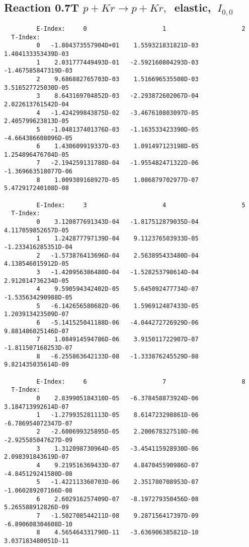 \documentclass[12pt]{article}
\begin{document}
\subsection{
Reaction 0.7T  $p + Kr \rightarrow p + Kr ,\ $
 elastic, $\  I_{0,0}$
}

\begin{small}\begin{verbatim}
         E-Index:     0                     1                     2
  T-Index:
         0   -1.804373557904D+01    1.559321831821D-03    1.404133353439D-03
         1    2.031777449493D-01   -2.592160804293D-03   -1.467585847319D-03
         2    9.686882765703D-03    1.516696535508D-03    3.516527725030D-05
         3    8.643169704852D-03   -2.293872602067D-04    2.022613761542D-04
         4   -1.424299843875D-02   -3.467610803097D-05    2.405799623813D-05
         5   -1.048137401376D-03   -1.163533423390D-05   -4.664386608096D-05
         6    1.430609919337D-03    1.091497123198D-05    1.254896476704D-05
         7   -2.194259131788D-04   -1.955482471322D-06   -1.369663518077D-06
         8    1.009389168927D-05    1.086879702977D-07    5.472917240108D-08
 
         E-Index:     3                     4                     5
  T-Index:
         0    3.120877691343D-04   -1.817512879035D-04    4.117059852657D-05
         1    1.242877797139D-04    9.112376503933D-05   -1.233416285351D-04
         2   -1.573876413696D-04    2.563895433480D-04    4.138546015912D-05
         3   -1.420956386480D-04   -1.528253798614D-04    2.912014736234D-05
         4    9.590594342402D-05    5.645092477734D-07   -1.535634290988D-05
         5   -6.142656580682D-06    1.596912487433D-05    1.203913423509D-07
         6   -5.141525041188D-06   -4.044272726929D-06    9.881486025146D-07
         7    1.084914594786D-06    3.915011722907D-07   -1.811507168253D-07
         8   -6.255863642133D-08   -1.333876245529D-08    9.821435035614D-09
 
         E-Index:     6                     7                     8
  T-Index:
         0    2.839905184310D-05   -6.378458873924D-06    3.184713992614D-07
         1   -1.279935281113D-05    8.614723298861D-06   -6.786954072347D-07
         2   -2.600699325895D-05    2.200678327510D-06   -2.925585047627D-09
         3    1.312098730964D-05   -3.454115928930D-06    2.098391843619D-07
         4    9.219516369433D-07    4.847045590986D-07   -4.845129241580D-08
         5   -1.422113360703D-06    2.351780708953D-07   -1.060289207166D-08
         6    2.602916257409D-07   -8.197279350456D-08    5.265588912826D-09
         7   -1.502708544211D-08    9.287156417397D-09   -6.890608304608D-10
         8    4.565464331790D-11   -3.636906385821D-10    3.037183480051D-11
\end{verbatim}\end{small}
 
\end{document}
